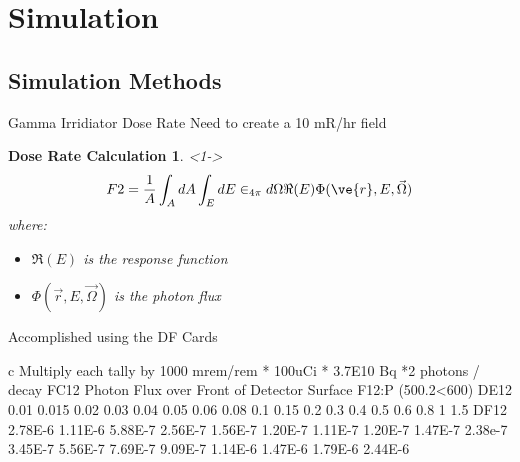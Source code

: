 
% 
%
\section{Simulation}

\subsection{Simulation Methods}

\begin{frame}{Gamma Irridiator Dose Rate}
Need to create a 10 mR/hr field
	\newtheorem{thm10}{Dose Rate Calculation}
	\begin{thm10}<1->
		$$F2 = \frac{1}{A} \int_{A}{dA}\int_{E}{dE}\in_{4\pi}{d\Omega \Re(E) \Phi(\ve{r},E,\vec{\Omega})} $$
	where:
	\begin{itemize}
		\tiny
		\item $\Re(E)$ is the response function
		\item $\Phi(\vec{r},E,\vec{\Omega})$ is the photon flux
	\end{itemize}
	\end{thm10}
Accomplished using the DF Cards
\begin{block}
c Multiply each tally by 1000 mrem/rem * 100uCi * 3.7E10 Bq *2 photons / decay
FC12 Photon Flux over Front of Detector Surface
F12:P (500.2<600)
DE12  0.01 0.015 0.02 0.03 0.04 0.05 0.06 0.08 0.1 0.15 0.2 0.3 0.4 0.5 0.6  
		0.8 1 1.5
DF12  2.78E-6 1.11E-6 5.88E-7 2.56E-7 1.56E-7 1.20E-7 1.11E-7 1.20E-7 1.47E-7
      2.38e-7 3.45E-7 5.56E-7 7.69E-7 9.09E-7 1.14E-6 1.47E-6 1.79E-6 2.44E-6
\end{block}
\end{frame}

